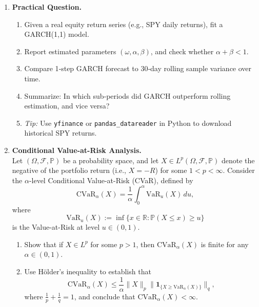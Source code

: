 \documentclass[11pt]{amsart}
\begin{document}
\begin{enumerate}[label=\arabic*.,noitemsep,left=0pt]
	\item \textbf{Practical Question.}\\
	      \begin{enumerate}[noitemsep,left=1em]
		      \item Given a real equity return series (e.g., SPY daily returns), fit a GARCH(1,1) model.
		      \item Report estimated parameters $(\omega,\alpha,\beta)$, and check whether $\alpha + \beta < 1$.
		      \item Compare 1‐step GARCH forecast to 30‐day rolling sample variance over time.
		      \item Summarize: In which sub‐periods did GARCH outperform rolling estimation, and vice versa?
		      \item \emph{Tip:} Use \texttt{yfinance} or \texttt{pandas\_datareader} in Python to download historical SPY returns.
	      \end{enumerate}

	\item \textbf{Conditional Value-at-Risk Analysis.}\\
	      Let $(\Omega, \mathcal{F}, \mathbb{P})$ be a probability space, and let $X \in L^p(\Omega, \mathcal{F}, \mathbb{P})$ denote the negative of the portfolio return (i.e., $X = -R$) for some $1 < p < \infty$. Consider the $\alpha$-level Conditional Value-at-Risk (CVaR), defined by
	      \[
		      \mathrm{CVaR}_\alpha(X) = \frac{1}{\alpha} \int_0^\alpha \mathrm{VaR}_u(X) \, du,
	      \]
	      where
	      \[
		      \mathrm{VaR}_u(X) := \inf \{ x \in \mathbb{R} : \mathbb{P}(X \leq x) \geq u \}
	      \]
	      is the Value-at-Risk at level $u \in (0, 1)$.
	      \begin{enumerate}[noitemsep,left=1em]
		      \item Show that if $X \in L^p$ for some $p > 1$, then $\mathrm{CVaR}_\alpha(X)$ is finite for any $\alpha \in (0, 1)$.
		      \item Use Hölder's inequality to establish that
		            \[
			            \mathrm{CVaR}_\alpha(X) \leq \frac{1}{\alpha} \| X \|_p \| \mathbf{1}_{\{ X \geq \mathrm{VaR}_\alpha(X) \}} \|_q,
		            \]
		            where $\frac{1}{p} + \frac{1}{q} = 1$, and conclude that $\mathrm{CVaR}_\alpha(X) < \infty$.
	      \end{enumerate}
\end{enumerate}
\end{document}
